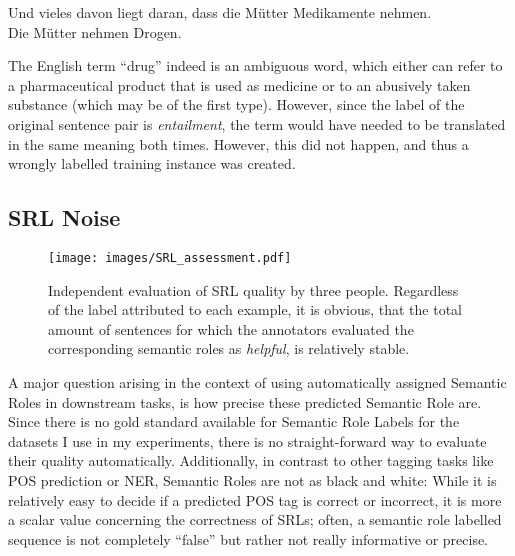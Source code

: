 {\begin{examples}
  \item Und vieles davon liegt daran, dass die Mütter Medikamente nehmen.\\
        Die Mütter nehmen Drogen.
\end{examples}

The English term ``drug'' indeed is an ambiguous word, which either can refer to a pharmaceutical
product that is used as medicine or to an abusively taken substance (which may be of the first
type). However, since
the label of the original sentence pair is \emph{entailment}, the term would have needed
to be translated in the same meaning both times. However, this did not happen, and thus
a wrongly labelled training instance was created.



\subsection{SRL Noise}
\label{sec:srl-noise}

\begin{wrapfigure}[19]{l}{0.65\linewidth}
  \begin{center}
    \texttt{[image: images/SRL\_assessment.pdf]}
  \end{center}
  \caption[SRL assessment]{Independent evaluation of SRL quality by three people. Regardless of the
    label attributed to each example, it is obvious, that the total amount of sentences for which the
    annotators evaluated the corresponding semantic roles as \emph{helpful}, is relatively stable.}
    \label{fig:SRL-assessment}
\end{wrapfigure}

A major question arising in the context of using automatically assigned Semantic
Roles in downstream tasks, is how precise these predicted Semantic Role are. Since
there is no gold standard available for Semantic Role Labels for the datasets I
use in my experiments, there is no straight-forward way to evaluate their quality
automatically. Additionally, in contrast to other tagging tasks like POS prediction
or NER, Semantic Roles are not as black and white: While it is relatively easy to
decide if a predicted POS tag is correct or incorrect, it is more a scalar value
concerning the correctness of SRLs; often, a semantic role labelled sequence is not
completely ``false'' but rather not really informative or precise.

}
